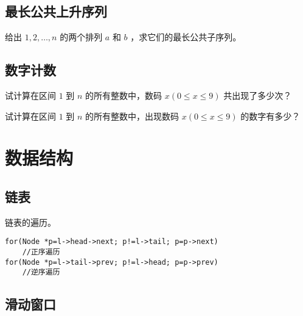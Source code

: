 \documentclass{probook}
\begin{document}
\begin{multicols}{2}


\section{最长公共上升序列}

给出 $1,2,\ldots,n$ 的两个排列 $a$ 和 $b$ ，求它们的最长公共子序列。



\section{数字计数}

试计算在区间 $1$ 到 $n$ 的所有整数中，数码 $x(0 \leqslant x \leqslant 9)$ 共出现了多少次？



试计算在区间 $1$ 到 $n$ 的所有整数中，出现数码 $x(0 \leqslant x \leqslant 9)$ 的数字有多少？









\chapter{数据结构}

\section{链表}



链表的遍历。

\begin{lstlisting}[style=cpp]
for(Node *p=l->head->next; p!=l->tail; p=p->next)
	//正序遍历
for(Node *p=l->tail->prev; p!=l->head; p=p->prev)
	//逆序遍历
\end{lstlisting}

\section{滑动窗口}




\end{multicols}
\end{document}
